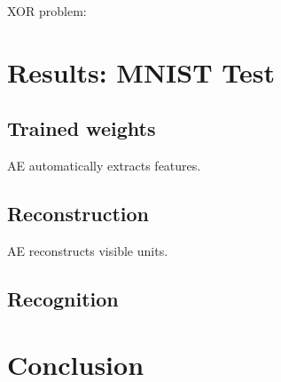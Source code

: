 XOR problem:


\section{Results: MNIST Test}
\subsection{Trained weights}
AE automatically extracts features.

\subsection{Reconstruction}
AE reconstructs visible units.

\subsection{Recognition}


\section{Conclusion}


